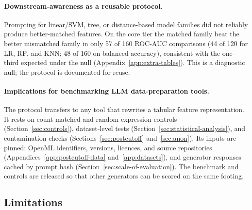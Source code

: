 \paragraph{Downstream-awareness as a reusable protocol.}

Prompting for linear/SVM, tree, or distance-based model families did not reliably produce better-matched features. On the core tier the matched family beat the better mismatched family in only 57 of 160 ROC-AUC comparisons (44 of 120 for LR, RF, and KNN; 48 of 160 on balanced accuracy), consistent with the one-third expected under the null (Appendix~\ref{app:extra-tables}). This is a diagnostic null; the protocol is documented for reuse.

\paragraph{Implications for benchmarking LLM data-preparation tools.}

The protocol transfers to any tool that rewrites a tabular feature representation. It rests on count-matched and random-expression controls (Section~\ref{sec:controls}), dataset-level tests (Section~\ref{sec:statistical-analysis}), and contamination checks (Sections~\ref{sec:postcutoff} and~\ref{sec:anon}). Its inputs are pinned: OpenML identifiers, versions, licences, and source repositories (Appendices~\ref{app:postcutoff-data} and~\ref{app:datasets}), and generator responses cached by prompt hash (Section~\ref{sec:scale-of-evaluation}). The benchmark and controls are released so that other generators can be scored on the same footing.

\subsection{Limitations}\label{sec:limitations}

